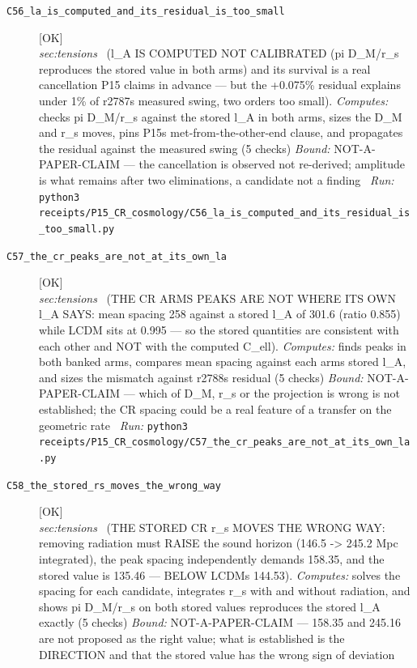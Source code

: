 \begin{description}
\item[\label{rcpt:C56_la_is_computed_and_its_residual_is_too_small}\texttt{C56\_la\_is\_computed\_and\_its\_residual\_is\_too\_small}]\hfill\textsf{[OK]}\\
\textit{sec:tensions} \ (l\_A IS COMPUTED NOT CALIBRATED (pi D\_M/r\_s reproduces the stored value in both arms) and its survival is a real cancellation P15 claims in advance --- but the +0.075\% residual explains under 1\% of r2787s measured swing, two orders too small). 
\emph{Computes:} checks pi D\_M/r\_s against the stored l\_A in both arms, sizes the D\_M and r\_s moves, pins P15s met-from-the-other-end clause, and propagates the residual against the measured swing (5 checks)
 \emph{Bound:} NOT-A-PAPER-CLAIM --- the cancellation is observed not re-derived; amplitude is what remains after two eliminations, a candidate not a finding
\ \emph{Run:} \texttt{python3 receipts/P15\_CR\_cosmology/C56\_la\_is\_computed\_and\_its\_residual\_is\_too\_small.py}
\item[\label{rcpt:C57_the_cr_peaks_are_not_at_its_own_la}\texttt{C57\_the\_cr\_peaks\_are\_not\_at\_its\_own\_la}]\hfill\textsf{[OK]}\\
\textit{sec:tensions} \ (THE CR ARMS PEAKS ARE NOT WHERE ITS OWN l\_A SAYS: mean spacing 258 against a stored l\_A of 301.6 (ratio 0.855) while LCDM sits at 0.995 --- so the stored quantities are consistent with each other and NOT with the computed C\_ell). 
\emph{Computes:} finds peaks in both banked arms, compares mean spacing against each arms stored l\_A, and sizes the mismatch against r2788s residual (5 checks)
 \emph{Bound:} NOT-A-PAPER-CLAIM --- which of D\_M, r\_s or the projection is wrong is not established; the CR spacing could be a real feature of a transfer on the geometric rate
\ \emph{Run:} \texttt{python3 receipts/P15\_CR\_cosmology/C57\_the\_cr\_peaks\_are\_not\_at\_its\_own\_la.py}
\item[\label{rcpt:C58_the_stored_rs_moves_the_wrong_way}\texttt{C58\_the\_stored\_rs\_moves\_the\_wrong\_way}]\hfill\textsf{[OK]}\\
\textit{sec:tensions} \ (THE STORED CR r\_s MOVES THE WRONG WAY: removing radiation must RAISE the sound horizon (146.5 -> 245.2 Mpc integrated), the peak spacing independently demands 158.35, and the stored value is 135.46 --- BELOW LCDMs 144.53). 
\emph{Computes:} solves the spacing for each candidate, integrates r\_s with and without radiation, and shows pi D\_M/r\_s on both stored values reproduces the stored l\_A exactly (5 checks)
 \emph{Bound:} NOT-A-PAPER-CLAIM --- 158.35 and 245.16 are not proposed as the right value; what is established is the DIRECTION and that the stored value has the wrong sign of deviation

\end{description}
